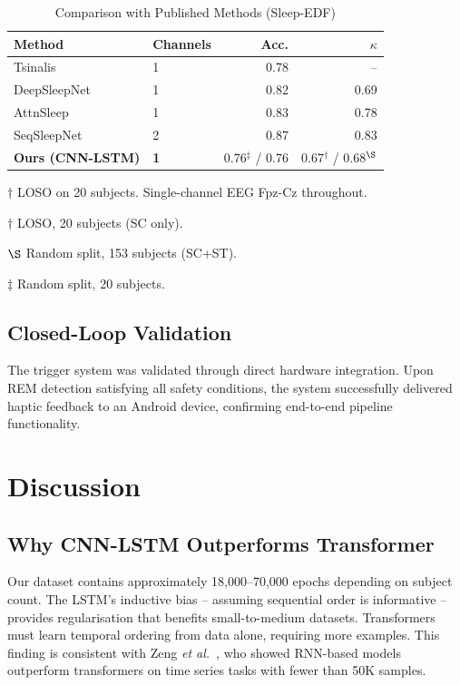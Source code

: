 \documentclass[journal]{IEEEtran}
\begin{document}
\begin{table}[h]
\caption{Comparison with Published Methods (Sleep-EDF)}
\label{tab:benchmarks}
\centering
\begin{tabular}{llrr}
\toprule
Method & Channels & Acc. & $\kappa$ \\
\midrule
Tsinalis~\cite{tsinalis2016}   & 1 & 0.78 & -- \\
DeepSleepNet~\cite{supratak2017} & 1 & 0.82 & 0.69 \\
AttnSleep~\cite{eldele2021}    & 1 & 0.83 & 0.78 \\
SeqSleepNet~\cite{phan2019}    & 2 & 0.87 & 0.83 \\
\midrule
\textbf{Ours (CNN-LSTM)} & \textbf{1} & 
0.76$^\ddagger$ / 0.76 & 0.67$^\dagger$ / 0.68$^\S$ \\
\bottomrule
\end{tabular}
\begin{tablenotes}
\small
\item $\dagger$ LOSO on 20 subjects.
Single-channel EEG Fpz-Cz throughout.
\item $\dagger$ LOSO, 20 subjects (SC only).
\item $\S$ Random split, 153 subjects (SC+ST).
\item $\ddagger$ Random split, 20 subjects.
\end{tablenotes}
\end{table}

\subsection{Closed-Loop Validation}

The trigger system was validated through direct
hardware integration.
Upon REM detection satisfying all safety conditions,
the system successfully delivered haptic feedback
to an Android device, confirming end-to-end
pipeline functionality.

\section{Discussion}
\label{sec:discussion}

\subsection{Why CNN-LSTM Outperforms Transformer}

Our dataset contains approximately 18,000--70,000
epochs depending on subject count.
The LSTM's inductive bias -- assuming sequential
order is informative -- provides regularisation
that benefits small-to-medium datasets.
Transformers must learn temporal ordering from data
alone, requiring more examples.
This finding is consistent with Zeng
\emph{et al.}~\cite{zeng2023}, who showed RNN-based
models outperform transformers on time series tasks
with fewer than 50K samples.
\end{document}

